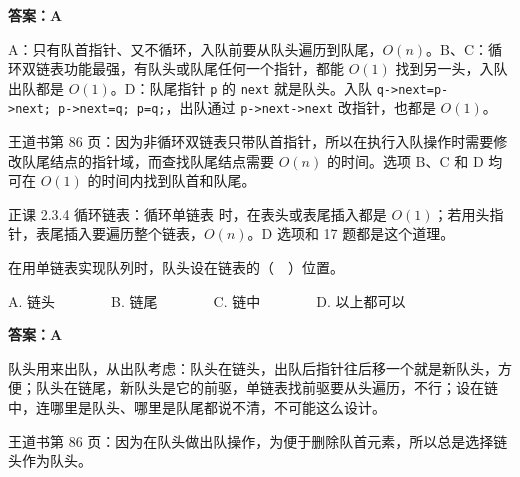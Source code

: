 \documentclass[10.5pt,a4paper,oneside]{article}
\newcommand{\hlred}[1]{\textcolor{wdred}{\bfseries #1}}
\newcommand{\uln}[1]{\CJKunderline[format=\color{wdred},thickness=0.9pt,depth=0.28em]{#1}}
\begin{document}
\hlred{\textbf{答案：A}}

\begin{videobox}

A：只有队首指针、又不循环，入队前要从队头遍历到队尾，\(O(n)\)。B、C：循环双链表功能最强，有队头或队尾任何一个指针，都能
\(O(1)\) 找到另一头，入队出队都是 \(O(1)\)。D：队尾指针 \texttt{p} 的
\texttt{next} 就是队头。入队
\texttt{q-\textgreater{}next=p-\textgreater{}next;\ p-\textgreater{}next=q;\ p=q;}，出队通过
\texttt{p-\textgreater{}next-\textgreater{}next} 改指针，也都是
\(O(1)\)。

\end{videobox}

\begin{jiexibox}

王道书第 86
页：因为非循环双链表只带队首指针，所以在执行入队操作时需要修改队尾结点的指针域，而查找队尾结点需要
\(O(n)\) 的时间。选项 B、C 和 D 均可在 \(O(1)\) 的时间内找到队首和队尾。

\end{jiexibox}

\begin{recallbox}

正课 2.3.4 循环链表：循环单链表\uln{仅设尾指针 \texttt{r}}
时，在表头或表尾插入都是
\(O(1)\)；若用头指针，表尾插入要遍历整个链表，\(O(n)\)。D 选项和 17
题都是这个道理。

\end{recallbox}

\begin{questionbox}[14]

在用单链表实现队列时，队头设在链表的（　）位置。

A. 链头　　　　B. 链尾　　　　C. 链中　　　　D. 以上都可以

\end{questionbox}

\hlred{\textbf{答案：A}}

\begin{videobox}

队头用来出队，从出队考虑：队头在链头，出队后指针往后移一个就是新队头，方便；队头在链尾，新队头是它的前驱，单链表找前驱要从头遍历，不行；设在链中，连哪里是队头、哪里是队尾都说不清，不可能这么设计。

\end{videobox}

\begin{jiexibox}

王道书第 86
页：因为在队头做出队操作，为便于删除队首元素，所以总是选择链头作为队头。

\end{jiexibox}
\end{document}
